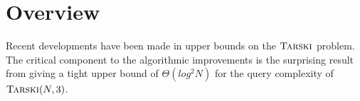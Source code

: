 \section{Overview}
Recent developments have been made in upper bounds on the $\textsc{Tarski}$ problem.
The critical component to the algorithmic improvements is
the surprising result from \citep{fasterTarski} giving a tight
upper bound of $\Theta(log^2N)$ for the query complexity of
$\textsc{Tarski}(N, 3)$.
